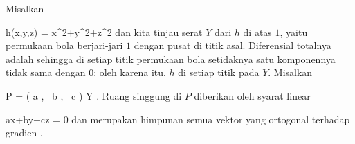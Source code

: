 {

Misalkan

\mavergleichskettedisp
{\vergleichskette
{ h(x,y,z)
}
{ =} { x^2+y^2+z^2
}
{ } {
}
{ } {
}
{ } {
}
}
{}{}{}
dan kita tinjau serat $Y$ dari $h$ di atas $1$, yaitu permukaan bola berjari-jari $1$ dengan pusat di titik asal. Diferensial totalnya adalah
 sehingga di setiap titik permukaan bola setidaknya satu komponennya tidak sama dengan $0$; oleh karena itu, $h$
di setiap titik pada $Y$. Misalkan

\mavergleichskette
{\vergleichskette
{ P
}
{ = }{ \left(  a   , \,   b  , \,  c                 \right)
}
{ \in }{ Y
}
{    }{
}
{   }{
}
}
{}{}{.}
Ruang singgung di $P$ diberikan oleh syarat linear

\mavergleichskettedisp
{\vergleichskette
{ ax+by+cz
}
{ =} { 0
}
{ } {
}
{ } {
}
{ } {
}
}
{}{}{}
dan merupakan himpunan semua vektor yang ortogonal terhadap gradien
.

}

